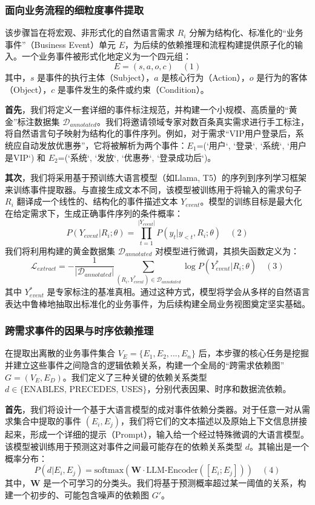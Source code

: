 \documentclass[12pt]{article}
\begin{document}
\subsubsection{面向业务流程的细粒度事件提取}

该步骤旨在将宏观、非形式化的自然语言需求 $R_i$ 分解为结构化、标准化的“业务事件”（Business Event）单元 $E$，为后续的依赖推理和流程构建提供原子化的输入。一个业务事件被形式化地定义为一个四元组：
$$
E = (s, a, o, c) \quad (1)
$$
其中，$s$ 是事件的执行主体（Subject），$a$ 是核心行为（Action），$o$ 是行为的客体（Object），$c$ 是事件发生的条件或约束（Condition）。

\textbf{首先}，我们将定义一套详细的事件标注规范，并构建一个小规模、高质量的“黄金”标注数据集 $\mathcal{D}_{annotated}$。我们将邀请领域专家对数百条真实需求进行手工标注，将自然语言句子映射为结构化的事件序列。例如，对于需求“VIP用户登录后，系统应自动发放优惠券”，它将被解析为两个事件：$E_1$=(`用户`, `登录`, `系统`, `用户是VIP`) 和 $E_2$=(`系统`, `发放`, `优惠券`, `登录成功后`)。

\textbf{其次}，我们将采用基于预训练大语言模型（如Llama, T5）的序列到序列学习框架来训练事件提取器。与直接生成文本不同，该模型被训练用于将输入的需求句子 $R_i$ 翻译成一个线性的、结构化的事件描述文本 $Y_{event}$。模型的训练目标是最大化在给定需求下，生成正确事件序列的条件概率：
$$
P(Y_{event} | R_i; \theta) = \prod_{t=1}^{|Y_{event}|} P(y_t | y_{<t}, R_i; \theta) \quad (2)
$$
我们将利用构建的黄金数据集 $\mathcal{D}_{annotated}$ 对模型进行微调，其损失函数定义为：
$$
\mathcal{L}_{extract} = - \frac{1}{|\mathcal{D}_{annotated}|} \sum_{(R_i, Y_{event}^*) \in \mathcal{D}_{annotated}} \log P(Y_{event}^* | R_i; \theta) \quad (3)
$$
其中 $Y_{event}^*$ 是专家标注的基准真相。通过这种方式，模型将学会从多样的自然语言表达中鲁棒地抽取出标准化的业务事件，为后续构建全局业务视图奠定坚实基础。

\subsubsection{跨需求事件的因果与时序依赖推理}

在提取出离散的业务事件集合 $V_E = \{E_1, E_2, ..., E_n\}$ 后，本步骤的核心任务是挖掘并建立这些事件之间隐含的逻辑依赖关系，构建一个全局的“跨需求依赖图” $G = (V_E, E_D)$。我们定义了三种关键的依赖关系类型 $d \in \{\text{ENABLES, PRECEDES, USES}\}$，分别代表因果、时序和数据流依赖。

\textbf{首先}，我们将设计一个基于大语言模型的成对事件依赖分类器。对于任意一对从需求集合中提取的事件 $(E_i, E_j)$，我们将它们的文本描述以及原始上下文信息拼接起来，形成一个详细的提示（Prompt），输入给一个经过特殊微调的大语言模型。该模型被训练用于预测这对事件之间最可能存在的依赖关系类型 $d$。其输出是一个概率分布：
$$
P(d | E_i, E_j) = \text{softmax}(\mathbf{W} \cdot \text{LLM-Encoder}([E_i; E_j])) \quad (4)
$$
其中，$\mathbf{W}$ 是一个可学习的分类头。我们将基于预测概率超过某一阈值的关系，构建一个初步的、可能包含噪声的依赖图 $G'$。
\end{document}
